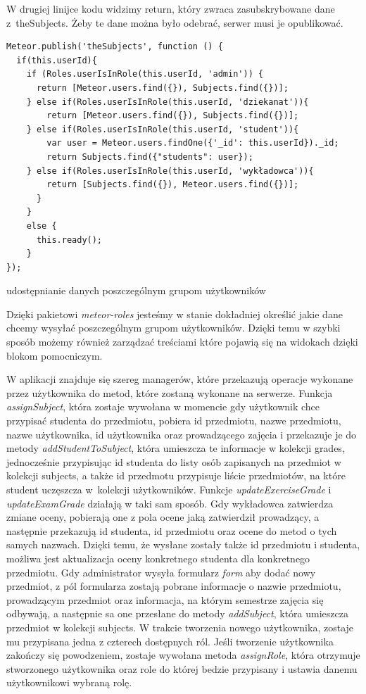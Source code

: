 \documentclass{xmgr}
\begin{document}
W drugiej linijce kodu widzimy return, który zwraca zasubskrybowane dane z~theSubjects. Żeby te dane można było odebrać, serwer musi je opublikować.

\begin{listing}[H]
\begin{verbatim}
Meteor.publish('theSubjects', function () {
  if(this.userId){
    if (Roles.userIsInRole(this.userId, 'admin')) {
      return [Meteor.users.find({}), Subjects.find({})];
    } else if(Roles.userIsInRole(this.userId, 'dziekanat')){
        return [Meteor.users.find({}), Subjects.find({})];
    } else if(Roles.userIsInRole(this.userId, 'student')){
        var user = Meteor.users.findOne({'_id': this.userId})._id;
        return Subjects.find({"students": user});
    } else if(Roles.userIsInRole(this.userId, 'wykładowca')){
        return [Subjects.find({}), Meteor.users.find({})];
      }
    }
    else {
      this.ready();
    }
});
\end{verbatim}
\caption{udostępnianie danych poszczególnym grupom użytkowników}
\end{listing}

Dzięki pakietowi \textit{meteor-roles} jesteśmy w stanie dokładniej określić jakie dane chcemy wysyłać poszczególnym grupom użytkowników. Dzięki temu w szybki sposób możemy również zarządzać treściami które pojawią się na widokach dzięki blokom pomocniczym.

W aplikacji znajduje się szereg managerów, które przekazują operacje wykonane przez użytkownika do metod, które zostaną wykonane na serwerze. Funkcja \textit{assignSubject}, która zostaje wywołana w momencie gdy użytkownik chce przypisać studenta do przedmiotu, pobiera id przedmiotu, nazwe przedmiotu, nazwe użytkownika, id użytkownika oraz prowadzącego zajęcia i przekazuje je do metody \textit{addStudentToSubject}, która umieszcza te informacje w kolekcji grades, jednocześnie przypisując id studenta do listy osób zapisanych na przedmiot w kolekcji subjects, a także id przedmotu przypisuje liście przedmiotów, na które student uczęszcza w~kolekcji użytkowników. Funkcje \textit{updateExerciseGrade} i \textit{updateExamGrade} działają w taki sam sposób. Gdy wykładowca zatwierdza zmiane oceny, pobierają one z pola ocene jaką zatwierdził prowadzący, a następnie przekazują id studenta, id przedmiotu oraz ocene do metod o tych samych nazwach. Dzięki temu, że wysłane zostały także id przedmiotu i studenta, możliwa jest aktualizacja oceny konkretnego studenta dla konkretnego przedmiotu. Gdy administrator wysyła formularz \textit{form} aby dodać nowy przedmiot, z pól formularza zostają pobrane informacje o nazwie przedmiotu, prowadzącym przedmiot oraz informacja, na którym semestrze zajęcia się odbywają, a następnie sa one przesłane do metody \textit{addSubject}, która umieszcza przedmiot w kolekcji subjects. W trakcie tworzenia nowego użytkownika, zostaje mu przypisana jedna z czterech dostępnych ról. Jeśli tworzenie użytkownika zakończy się powodzeniem, zostaje wywołana metoda \textit{assignRole}, która otrzymuje stworzonego użytkownika oraz role do której bedzie przypisany i ustawia danemu użytkownikowi wybraną rolę.
\end{document}
